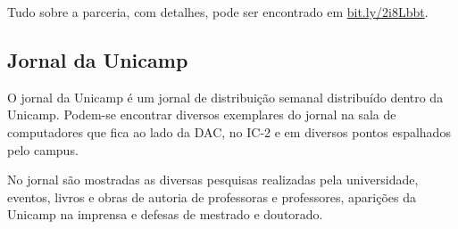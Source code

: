 Tudo sobre a parceria, com detalhes, pode ser encontrado em
\url{bit.ly/2i8Lbbt}.

\subsection{Jornal da Unicamp}

O jornal da Unicamp é um jornal de distribuição semanal distribuído dentro da
Unicamp. Podem-se encontrar diversos exemplares do jornal na sala de
computadores que fica ao lado da DAC, no IC-2 e em diversos pontos espalhados
pelo campus.

No jornal são mostradas as diversas pesquisas realizadas pela universidade,
eventos, livros e obras de autoria de professoras e professores, aparições da
Unicamp na imprensa e defesas de mestrado e doutorado.
